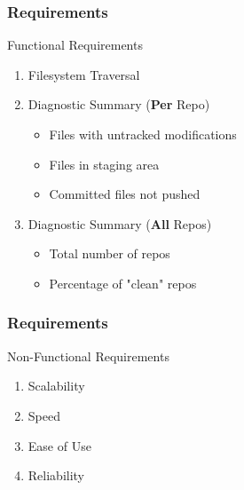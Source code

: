\begin{frame}
	\centering
	\frametitle{Requirements}
	\begin{block}{Functional Requirements}
		\begin{enumerate}
			\item <1-> Filesystem Traversal
			\item <2->Diagnostic Summary (\textbf{Per} Repo)
			\pause
			\begin{itemize}
				\item <2-> Files with untracked modifications
				\item <2-> Files in staging area
				\item <2-> Committed files not pushed
			\end{itemize}
			\item <3-> Diagnostic Summary (\textbf{All} Repos)
			\begin{itemize}
				\item <3-> Total number of repos
				\item <3-> Percentage of "clean" repos
			\end{itemize}
		\end{enumerate}		
	\end{block}
\end{frame}

\begin{frame}
	\centering
	\frametitle{Requirements}
	
	\begin{block}{Non-Functional Requirements}
		\begin{enumerate}
			\item <1->Scalability
			\item <2-> Speed
			\item <3-> Ease of Use
			\item <4-> Reliability
		\end{enumerate}		
	\end{block}
\end{frame}